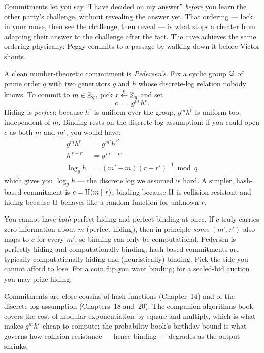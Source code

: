 \begin{intuitionbox}
Commitments let you say ``I have decided on my answer'' \emph{before} you learn
the other party's challenge, without revealing the answer yet. That ordering ---
lock in your move, then see the challenge, then reveal --- is what stops a cheater
from adapting their answer to the challenge after the fact. The cave achieves
the same ordering physically: Peggy commits to a passage by walking down it
before Victor shouts.
\end{intuitionbox}

A clean number-theoretic commitment is \emph{Pedersen's}. Fix a cyclic group
$\mathbb{G}$ of prime order $q$ with two generators $g$ and $h$ whose discrete-log
relation nobody knows. To commit to $m \in \mathbb{Z}_q$, pick $r \stackrel{\$}{\gets} \mathbb{Z}_q$ and set
\[
  c \;=\; g^{m}\, h^{r}.
\]
Hiding is \emph{perfect}: because $h^r$ is uniform over the group, $g^m h^r$ is
uniform too, independent of $m$. Binding rests on the discrete-log assumption:
if you could open $c$ as both $m$ and $m'$, you would have:
\begin{align*}
  g^{m}h^{r} &= g^{m'}h^{r'} \\
  h^{\,r-r'} &= g^{\,m'-m} \\
  \log_g h &= (m'-m)(r-r')^{-1} \bmod q
\end{align*}
which gives you $\log_g h$ --- the discrete log we assumed is
hard. A simpler, hash-based commitment is $c = \operatorname{H}(m \,\|\, r)$, binding
because $\operatorname{H}$ is collision-resistant and hiding because $\operatorname{H}$ behaves like a
random function for unknown $r$.

\begin{trapbox}
You cannot have \emph{both} perfect hiding and perfect binding at once. If $c$
truly carries zero information about $m$ (perfect hiding), then in principle
\emph{some} $(m', r')$ also maps to $c$ for every $m'$, so binding can only be
computational. Pedersen is perfectly hiding and computationally binding;
hash-based commitments are typically computationally hiding and (heuristically)
binding. Pick the side you cannot afford to lose. For a coin flip you want
binding; for a sealed-bid auction you may prize hiding.
\end{trapbox}

\begin{connectionbox}
Commitments are close cousins of hash functions (Chapter~14) and
of the discrete-log assumption (Chapters~18 and~20). The
companion algorithms book covers the cost of modular exponentiation by
square-and-multiply, which is what makes $g^m h^r$ cheap to compute; the
probability book's birthday bound is what governs how collision-resistance ---
hence binding --- degrades as the output shrinks.
\end{connectionbox}

